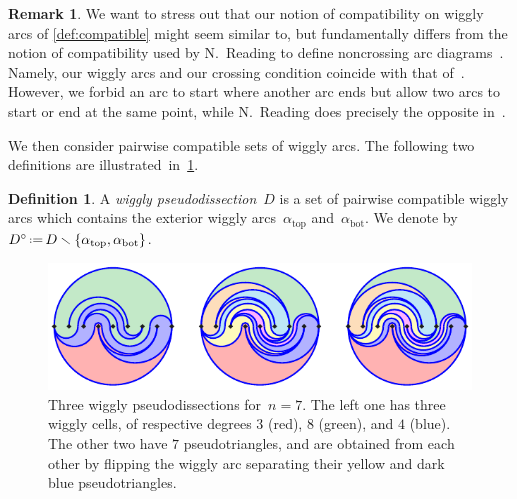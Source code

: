 \documentclass{amsart}
\theoremstyle{definition}
\newtheorem{definition}[theorem]{Definition}
\newtheorem{remark}[theorem]{Remark}
\newcommand{\ssm}{\smallsetminus} %
\newcommand{\eqdef}{\mbox{\,\raisebox{0.2ex}{\scriptsize\ensuremath{\mathrm:}}\ensuremath{=}\,}} %
\newcommand{\darkblue}{\color{darkblue}} %
\newcommand{\defn}[1]{\textsl{\darkblue #1}} %
\newcommand{\vincent}[1]{\todo[color=blue!30]{\rm #1 \\ \hfill --- V.}}
\begin{document}
\begin{remark}
We want to stress out that our notion of compatibility on wiggly arcs of \cref{def:compatible} might seem similar to, but fundamentally differs from the notion of compatibility used by N.~Reading to define noncrossing arc diagrams~\cite{Reading-arcDiagrams}.
Namely, our wiggly arcs and our crossing condition coincide with that of~\cite{Reading-arcDiagrams}.
However, we forbid an arc to start where another arc ends but allow two arcs to start or end at the same point,
while N.~Reading does precisely the opposite in~\cite{Reading-arcDiagrams}.
\end{remark}

We then consider pairwise compatible sets of wiggly arcs.
The following two definitions are illustrated~in~\cref{fig:pseudodissections}.

\begin{definition}
A \defn{wiggly pseudodissection}~$D$ is a set of pairwise compatible wiggly arcs which contains the exterior wiggly arcs~$\alpha_\mathrm{top}$ and~$\alpha_\mathrm{bot}$. We denote by~$D^\circ \eqdef D \ssm \{\alpha_\mathrm{top}, \alpha_\mathrm{bot}\}$.
%
\begin{figure}
\centerline{\includegraphics[scale=1.5]{wigglyPseudodissections}}
\caption{Three wiggly pseudodissections for~$n = 7$. The left one has three wiggly cells, of respective degrees $3$ (red), $8$ (green), and $4$ (blue). The other two have $7$ pseudotriangles, and are obtained from each other by flipping the wiggly arc separating their yellow and dark blue pseudotriangles.}
\label{fig:pseudodissections}
\end{figure}
\end{definition}

\end{document}
